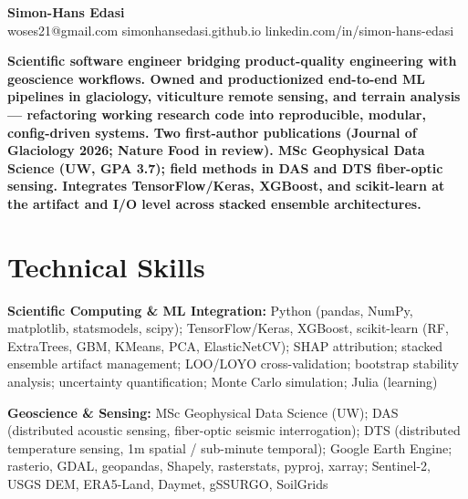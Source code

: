 \documentclass[11pt,a4paper]{article}
\begin{document}

\begin{center}
    {\LARGE \textbf{Simon-Hans Edasi}} \\[6pt]
    woses21@gmail.com \hfill \textbar \hfill
    simonhansedasi.github.io \hfill \textbar \hfill
    linkedin.com/in/simon-hans-edasi
\end{center}

\vspace{0.3cm}

\noindent
\textbf{Scientific software engineer bridging product-quality engineering with geoscience workflows. Owned and productionized end-to-end ML pipelines in glaciology, viticulture remote sensing, and terrain analysis --- refactoring working research code into reproducible, modular, config-driven systems. Two first-author publications (Journal of Glaciology 2026; Nature Food in review). MSc Geophysical Data Science (UW, GPA 3.7); field methods in DAS and DTS fiber-optic sensing. Integrates TensorFlow/Keras, XGBoost, and scikit-learn at the artifact and I/O level across stacked ensemble architectures.}

\section*{Technical Skills}

\noindent
\textbf{Scientific Computing \& ML Integration:} Python (pandas, NumPy, matplotlib, statsmodels, scipy); TensorFlow/Keras, XGBoost, scikit-learn (RF, ExtraTrees, GBM, KMeans, PCA, ElasticNetCV); SHAP attribution; stacked ensemble artifact management; LOO/LOYO cross-validation; bootstrap stability analysis; uncertainty quantification; Monte Carlo simulation; Julia (learning)

\noindent
\textbf{Geoscience \& Sensing:} MSc Geophysical Data Science (UW); DAS (distributed acoustic sensing, fiber-optic seismic interrogation); DTS (distributed temperature sensing, 1m spatial / sub-minute temporal); Google Earth Engine; rasterio, GDAL, geopandas, Shapely, rasterstats, pyproj, xarray; Sentinel-2, USGS DEM, ERA5-Land, Daymet, gSSURGO, SoilGrids
\end{document}
